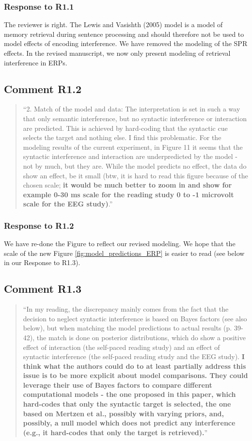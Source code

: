 \documentclass[12pt]{article}
\begin{document}
\subsubsection*{Response to R1.1}
The reviewer is right. The Lewis and Vasishth (2005) model is a model of memory retrieval during sentence processing and should therefore not be used to model effects of encoding interference. We have removed the modeling of the SPR effects. In the revised manuscript, we now only present modeling of retrieval interference in ERPs. 

\subsection*{Comment R1.2}
\begin{quote}
``2. Match of the model and data: The interpretation is set in such a way that only semantic interference, but no syntactic interference or interaction are predicted. This is achieved by hard-coding that the syntactic cue selects the target and nothing else. I find this problematic. For the modeling results of the current experiment, in Figure 11 it seems that the syntactic interference and interaction are underpredicted by the model - not by much, but they are. While the model predicts no effect, the data do show an effect, be it small (btw, it is hard to read this figure because of the chosen scale; \textbf{it would be much better to zoom in and show for example 0-30 ms scale for the reading study 0 to -1 microvolt scale for the EEG study)}.''\end{quote}

\subsubsection*{Response to R1.2}
We have re-done the Figure to reflect our revised modeling. We hope that the scale of the new Figure \ref{fig:model_predictions_ERP} is easier to read (see below in our Response to R1.3).

\subsection*{Comment R1.3}
\begin{quote}
``In my reading, the discrepancy mainly comes from the fact that the decision to neglect syntactic interference is based on Bayes factors (see also below), but when matching the model predictions to actual results (p. 39-42), the match is done on posterior distributions, which do show a positive effect of interaction (the self-paced reading study) and an effect of syntactic interference (the self-paced reading study and the EEG study). \textbf{I think what the authors could do to at least partially address this issue is to be more explicit about model comparisons. They could leverage their use of Bayes factors to compare different computational models - the one proposed in this paper, which hard-codes that only the syntactic target is selected, the one based on Mertzen et al., possibly with varying priors, and, possibly, a null model which does not predict any interference (e.g., it hard-codes that only the target is retrieved).}''\end{quote}
\end{document}
